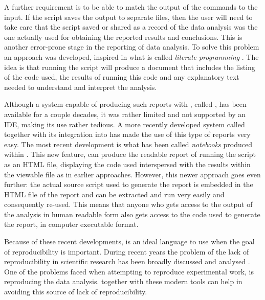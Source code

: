 \documentclass[krantz2]{krantz}\usepackage{knitr}
\begin{document}
A further requirement is to be able to match the output of the \Rlang commands to the input. If the script saves the output to separate files, then the user will need to take care that the script saved or shared as a record of the data analysis was the one actually used for obtaining the reported results and conclusions. This is another error-prone stage in the reporting of data analysis. To solve this problem an approach was developed, inspired in what is called \emph{literate programming} \autocite{Knuth1984a}. The idea is that running the script will produce a document that includes the listing of the \Rlang code used, the results of running this code and any explanatory text needed to understand and interpret the analysis.

Although a system capable of producing such reports with \Rlang, called  \autocite{Leisch2002}, has been available for a couple decades, it was rather limited and not supported by an IDE, making its use rather tedious. A more recently developed system called  \autocite{Xie2013} together with its integration into \RStudio has made the use of this type of reports very easy. The most recent development is what has been called \Rlang \emph{notebooks} produced within \RStudio. This new feature, can produce the readable report of running the script as an HTML file, displaying the code used interspersed with the results within the viewable file as in earlier approaches. However, this newer approach goes even further: the actual source script used to generate the report is embedded in the HTML file of the report and can be extracted and run very easily and consequently re-used. This means that anyone who gets access to the output of the analysis in human readable form also gets access to the code used to generate the report, in computer executable format.

Because of these recent developments, \Rlang is an ideal language to use when the goal of reproducibility is important. During recent years the problem of the lack of reproducibility in scientific research has been broadly discussed and analysed \autocite{Gandrud2015}. One of the problems faced when attempting to reproduce experimental work, is reproducing the data analysis. \Rlang together with these modern tools can help in avoiding this source of lack of reproducibility.
\end{document}
